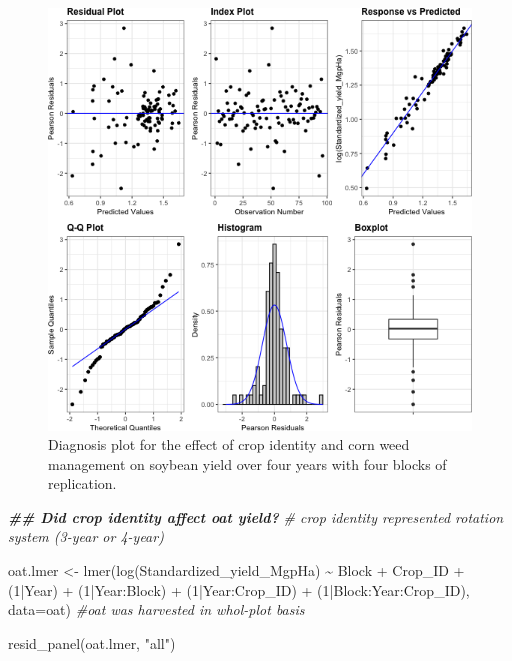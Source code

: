 \documentclass[
]{article}
\newenvironment{Shaded}{\begin{snugshade}}{\end{snugshade}}
\newcommand{\AttributeTok}[1]{\textcolor[rgb]{0.77,0.63,0.00}{#1}}
\newcommand{\CommentTok}[1]{\textcolor[rgb]{0.56,0.35,0.01}{\textit{#1}}}
\newcommand{\DecValTok}[1]{\textcolor[rgb]{0.00,0.00,0.81}{#1}}
\newcommand{\DocumentationTok}[1]{\textcolor[rgb]{0.56,0.35,0.01}{\textbf{\textit{#1}}}}
\newcommand{\FunctionTok}[1]{\textcolor[rgb]{0.00,0.00,0.00}{#1}}
\newcommand{\NormalTok}[1]{#1}
\newcommand{\OtherTok}[1]{\textcolor[rgb]{0.56,0.35,0.01}{#1}}
\newcommand{\SpecialCharTok}[1]{\textcolor[rgb]{0.00,0.00,0.00}{#1}}
\newcommand{\StringTok}[1]{\textcolor[rgb]{0.31,0.60,0.02}{#1}}
\begin{document}
\begin{figure}
\centering
\includegraphics{AppendixA-model-diagnosis_files/figure-latex/soy-mod-1.png}
\caption{\label{fig:soy-mod}Diagnosis plot for the effect of crop identity and corn weed management on soybean yield over four years with four blocks of replication.}
\end{figure}

\begin{Shaded}
\begin{Highlighting}[]
\DocumentationTok{\#\# Did crop identity affect oat yield?}
\CommentTok{\# crop identity represented rotation system (3{-}year or 4{-}year)}

\NormalTok{oat.lmer }\OtherTok{\textless{}{-}} \FunctionTok{lmer}\NormalTok{(}\FunctionTok{log}\NormalTok{(Standardized\_yield\_MgpHa) }\SpecialCharTok{\textasciitilde{}}\NormalTok{ Block }\SpecialCharTok{+} 
\NormalTok{                   Crop\_ID }\SpecialCharTok{+} 
\NormalTok{                   (}\DecValTok{1}\SpecialCharTok{|}\NormalTok{Year) }\SpecialCharTok{+}
\NormalTok{                   (}\DecValTok{1}\SpecialCharTok{|}\NormalTok{Year}\SpecialCharTok{:}\NormalTok{Block) }\SpecialCharTok{+}  
\NormalTok{                   (}\DecValTok{1}\SpecialCharTok{|}\NormalTok{Year}\SpecialCharTok{:}\NormalTok{Crop\_ID) }\SpecialCharTok{+}
\NormalTok{                   (}\DecValTok{1}\SpecialCharTok{|}\NormalTok{Block}\SpecialCharTok{:}\NormalTok{Year}\SpecialCharTok{:}\NormalTok{Crop\_ID),}
  \AttributeTok{data=}\NormalTok{oat) }\CommentTok{\#oat was harvested in whol{-}plot basis }

\FunctionTok{resid\_panel}\NormalTok{(oat.lmer, }\StringTok{"all"}\NormalTok{)}
\end{Highlighting}
\end{Shaded}
\end{document}
